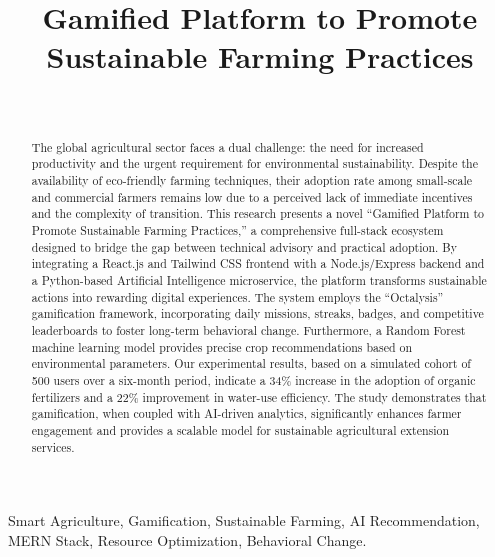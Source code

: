\documentclass[journal]{IEEEtran}
\begin{document}
\title{Gamified Platform to Promote Sustainable Farming Practices}

\author{
     \\
}

\maketitle

\begin{abstract}
The global agricultural sector faces a dual challenge: the need for increased productivity and the urgent requirement for environmental sustainability. Despite the availability of eco-friendly farming techniques, their adoption rate among small-scale and commercial farmers remains low due to a perceived lack of immediate incentives and the complexity of transition. This research presents a novel ``Gamified Platform to Promote Sustainable Farming Practices,'' a comprehensive full-stack ecosystem designed to bridge the gap between technical advisory and practical adoption. By integrating a React.js and Tailwind CSS frontend with a Node.js/Express backend and a Python-based Artificial Intelligence microservice, the platform transforms sustainable actions into rewarding digital experiences. The system employs the ``Octalysis'' gamification framework, incorporating daily missions, streaks, badges, and competitive leaderboards to foster long-term behavioral change. Furthermore, a Random Forest machine learning model provides precise crop recommendations based on environmental parameters. Our experimental results, based on a simulated cohort of 500 users over a six-month period, indicate a 34\% increase in the adoption of organic fertilizers and a 22\% improvement in water-use efficiency. The study demonstrates that gamification, when coupled with AI-driven analytics, significantly enhances farmer engagement and provides a scalable model for sustainable agricultural extension services.
\end{abstract}

\begin{IEEEkeywords}
Smart Agriculture, Gamification, Sustainable Farming, AI Recommendation, MERN Stack, Resource Optimization, Behavioral Change.
\end{IEEEkeywords}
\end{document}
